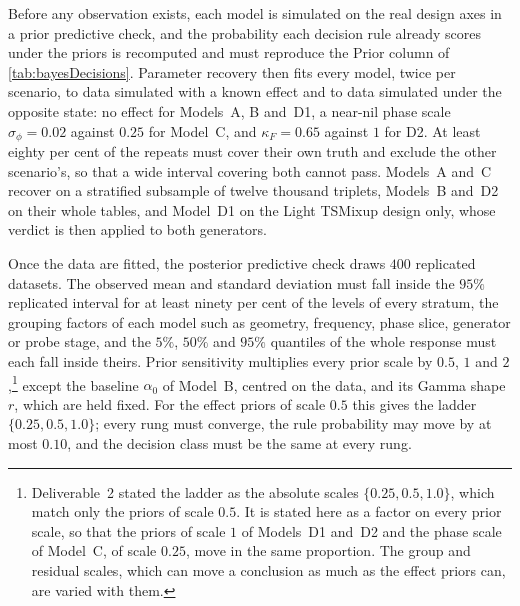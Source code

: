 Before any observation exists, each model is simulated on the real design axes in a prior predictive check, and the probability each decision rule already scores under the priors is recomputed and must reproduce the Prior column of \autoref{tab:bayesDecisions}. Parameter recovery then fits every model, twice per scenario, to data simulated with a known effect and to data simulated under the opposite state: no effect for Models~A, B and~D1, a near-nil phase scale $\sigma_\phi=0.02$ against $0.25$ for Model~C, and $\kappa_F=0.65$ against $1$ for D2. At least eighty per cent of the repeats must cover their own truth and exclude the other scenario's, so that a wide interval covering both cannot pass. Models~A and~C recover on a stratified subsample of twelve thousand triplets, Models~B and~D2 on their whole tables, and Model~D1 on the Light TSMixup design only, whose verdict is then applied to both generators.

Once the data are fitted, the posterior predictive check draws $400$ replicated datasets. The observed mean and standard deviation must fall inside the $95\%$ replicated interval for at least ninety per cent of the levels of every stratum, the grouping factors of each model such as geometry, frequency, phase slice, generator or probe stage, and the $5\%$, $50\%$ and $95\%$ quantiles of the whole response must each fall inside theirs. Prior sensitivity multiplies every prior scale by $0.5$, $1$ and $2$,\footnote{Deliverable~2 stated the ladder as the absolute scales $\{0.25,0.5,1.0\}$, which match only the priors of scale $0.5$. It is stated here as a factor on every prior scale, so that the priors of scale $1$ of Models~D1 and~D2 and the phase scale of Model~C, of scale $0.25$, move in the same proportion. The group and residual scales, which can move a conclusion as much as the effect priors can, are varied with them.} except the baseline $\alpha_0$ of Model~B, centred on the data, and its Gamma shape $r$, which are held fixed. For the effect priors of scale $0.5$ this gives the ladder $\{0.25,0.5,1.0\}$; every rung must converge, the rule probability may move by at most $0.10$, and the decision class must be the same at every rung.

